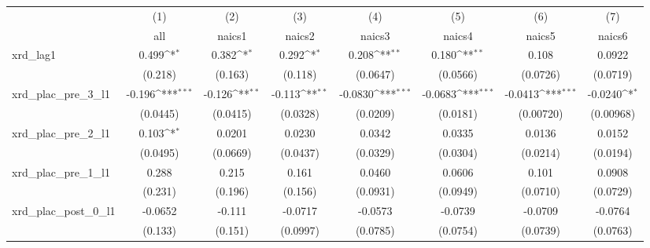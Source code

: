 {
\def\sym#1{\ifmmode^{#1}\else\(^{#1}\)\fi}
\begin{tabular}{l*{7}{c}}
\hline\hline
            &\multicolumn{1}{c}{(1)}&\multicolumn{1}{c}{(2)}&\multicolumn{1}{c}{(3)}&\multicolumn{1}{c}{(4)}&\multicolumn{1}{c}{(5)}&\multicolumn{1}{c}{(6)}&\multicolumn{1}{c}{(7)}\\
            &\multicolumn{1}{c}{all}&\multicolumn{1}{c}{naics1}&\multicolumn{1}{c}{naics2}&\multicolumn{1}{c}{naics3}&\multicolumn{1}{c}{naics4}&\multicolumn{1}{c}{naics5}&\multicolumn{1}{c}{naics6}\\
\hline
xrd\_lag1    &       0.499\sym{*}  &       0.382\sym{*}  &       0.292\sym{*}  &       0.208\sym{**} &       0.180\sym{**} &       0.108         &      0.0922         \\
            &     (0.218)         &     (0.163)         &     (0.118)         &    (0.0647)         &    (0.0566)         &    (0.0726)         &    (0.0719)         \\
[1em]
xrd\_plac\_pre\_3\_l1&      -0.196\sym{***}&      -0.126\sym{**} &      -0.113\sym{**} &     -0.0830\sym{***}&     -0.0683\sym{***}&     -0.0413\sym{***}&     -0.0240\sym{*}  \\
            &    (0.0445)         &    (0.0415)         &    (0.0328)         &    (0.0209)         &    (0.0181)         &   (0.00720)         &   (0.00968)         \\
[1em]
xrd\_plac\_pre\_2\_l1&       0.103\sym{*}  &      0.0201         &      0.0230         &      0.0342         &      0.0335         &      0.0136         &      0.0152         \\
            &    (0.0495)         &    (0.0669)         &    (0.0437)         &    (0.0329)         &    (0.0304)         &    (0.0214)         &    (0.0194)         \\
[1em]
xrd\_plac\_pre\_1\_l1&       0.288         &       0.215         &       0.161         &      0.0460         &      0.0606         &       0.101         &      0.0908         \\
            &     (0.231)         &     (0.196)         &     (0.156)         &    (0.0931)         &    (0.0949)         &    (0.0710)         &    (0.0729)         \\
[1em]
xrd\_plac\_post\_0\_l1&     -0.0652         &      -0.111         &     -0.0717         &     -0.0573         &     -0.0739         &     -0.0709         &     -0.0764         \\
            &     (0.133)         &     (0.151)         &    (0.0997)         &    (0.0785)         &    (0.0754)         &    (0.0739)         &    (0.0763)         \\

\end{tabular}}
